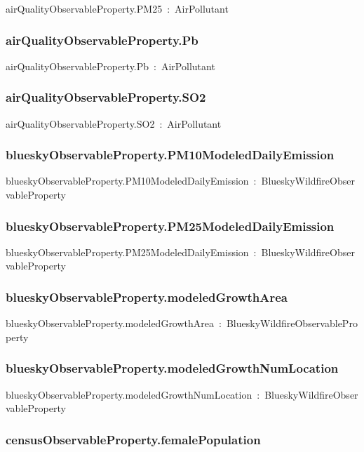 \documentclass{article}
\begin{document}
airQualityObservableProperty.PM25~:~AirPollutant

\subsubsection*{airQualityObservableProperty.Pb}

airQualityObservableProperty.Pb~:~AirPollutant

\subsubsection*{airQualityObservableProperty.SO2}

airQualityObservableProperty.SO2~:~AirPollutant

\subsubsection*{blueskyObservableProperty.PM10ModeledDailyEmission}

blueskyObservableProperty.PM10ModeledDailyEmission~:~BlueskyWildfireObservableProperty

\subsubsection*{blueskyObservableProperty.PM25ModeledDailyEmission}

blueskyObservableProperty.PM25ModeledDailyEmission~:~BlueskyWildfireObservableProperty

\subsubsection*{blueskyObservableProperty.modeledGrowthArea}

blueskyObservableProperty.modeledGrowthArea~:~BlueskyWildfireObservableProperty

\subsubsection*{blueskyObservableProperty.modeledGrowthNumLocation}

blueskyObservableProperty.modeledGrowthNumLocation~:~BlueskyWildfireObservableProperty

\subsubsection*{censusObservableProperty.femalePopulation}
\end{document}

